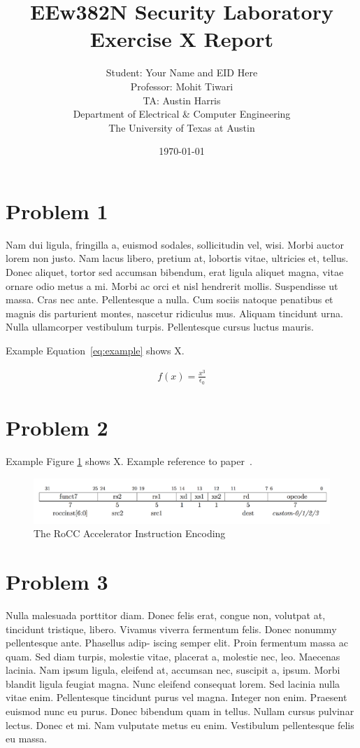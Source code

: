 \documentclass[11pt]{article}
\author{Student: Your Name and EID Here \\ Professor: Mohit Tiwari \\ TA: Austin Harris \\ Department of Electrical \& Computer Engineering \\ The University of Texas at Austin}
\date{\today}
\title{EEw382N Security Laboratory Exercise X Report}
\begin{document}
\maketitle
\section{Problem 1}
\label{sec:prob-1}
Nam dui ligula, fringilla a, euismod sodales, sollicitudin vel, wisi. Morbi
auctor lorem non justo. Nam lacus libero, pretium at, lobortis vitae, ultricies
et, tellus. Donec aliquet, tortor sed accumsan bibendum, erat ligula aliquet
magna, vitae ornare odio metus a mi. Morbi ac orci et nisl hendrerit mollis.
Suspendisse ut massa. Cras nec ante. Pellentesque a nulla. Cum sociis natoque
penatibus et magnis dis parturient montes, nascetur ridiculus mus. Aliquam
tincidunt urna. Nulla ullamcorper vestibulum turpis. Pellentesque cursus luctus
mauris.

Example Equation~\ref{eq:example} shows X.

\begin{align}
f(x) = \frac{x^3}{\epsilon_0}
\label{eq:example}
\end{align}

\section{Problem 2}
\label{sec:prob-2}
Example Figure \ref{fig:rocc-encoding} shows X. Example reference to paper~\cite{Brasser17}.

\begin{figure}[htbp]
\centering
\includegraphics[width=.9\linewidth]{./rocc-encoding.png}
\caption{\label{fig:rocc-encoding}
The RoCC Accelerator Instruction Encoding}
\end{figure}
\section{Problem 3}
\label{sec:prob-3}
Nulla malesuada porttitor diam. Donec felis erat, congue non, volutpat at,
tincidunt tristique, libero. Vivamus viverra fermentum felis. Donec nonummy
pellentesque ante. Phasellus adip- iscing semper elit. Proin fermentum massa ac
quam. Sed diam turpis, molestie vitae, placerat a, molestie nec, leo. Maecenas
lacinia. Nam ipsum ligula, eleifend at, accumsan nec, suscipit a, ipsum. Morbi
blandit ligula feugiat magna. Nunc eleifend consequat lorem. Sed lacinia nulla
vitae enim. Pellentesque tincidunt purus vel magna. Integer non enim. Praesent
euismod nunc eu purus. Donec bibendum quam in tellus. Nullam cursus pulvinar
lectus. Donec et mi. Nam vulputate metus eu enim. Vestibulum pellentesque felis
eu massa.
\end{document}
